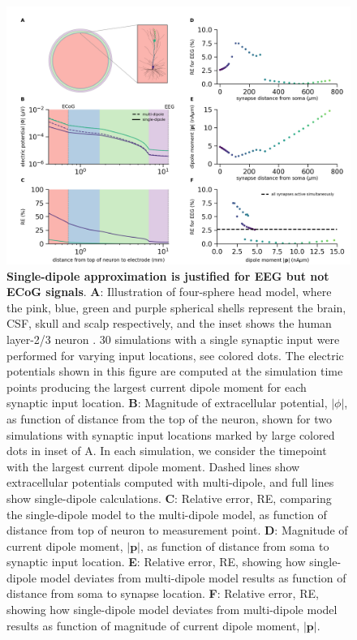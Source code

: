 \documentclass[preprint,10pt,authoryear]{elsarticle}
\newcommand{\hlg}[2][Emerald]{ {\sethlcolor{#1} \hl{#2}} }
\newcommand{\sntxt}[1]{{\color{NavyBlue}#1}}
\newcommand{\tvnnote}[1]{\color{white}{\hlg{TVN: #1 }}\color{black}}
\begin{document}
\begin{figure}[H]
	\centering
	\includegraphics[width=1.0\textwidth]{fig_compare_multi_single_dipole_segev_syns_from_path.png}
	\caption{\textbf{Single-dipole approximation is justified for EEG but not ECoG signals}. 
	\textbf{A}: Illustration of four-sphere head model, where the pink, blue, green and purple spherical shells represent the brain, CSF, skull and scalp respectively, and the inset shows the human layer-2/3 neuron \citep{EYAL2016}. $30$ simulations with a single synaptic input were performed for varying input locations, see colored dots. \sntxt{The electric potentials shown in this figure are computed at the simulation time points producing the largest current dipole moment for each synaptic input location.}
	\textbf{B}: Magnitude of extracellular potential, $|\phi|$, as function of distance from the top of the neuron, shown for two simulations with synaptic input locations marked by large colored dots in inset of A. In each simulation, we consider the timepoint with the largest current dipole moment. Dashed lines show extracellular potentials computed with multi-dipole, and full lines show single-dipole calculations.
	\textbf{C}: Relative error, RE, comparing the single-dipole model to the multi-dipole model, as function of distance from top of neuron to measurement point.
	\textbf{D}: Magnitude of current dipole moment, $|\mathbf{p}|$, as function of distance from soma to synaptic input location.
	\textbf{E}: Relative error, RE, showing how single-dipole model deviates from multi-dipole model results as function of distance from soma to synapse location.
	\textbf{F}: Relative error, RE, showing how single-dipole model deviates from multi-dipole model results as function of magnitude of current dipole moment, $|\mathbf{p}|$.
	}

	\label{fig:compare_multi_single_dipole}
\end{figure}
\end{document}
